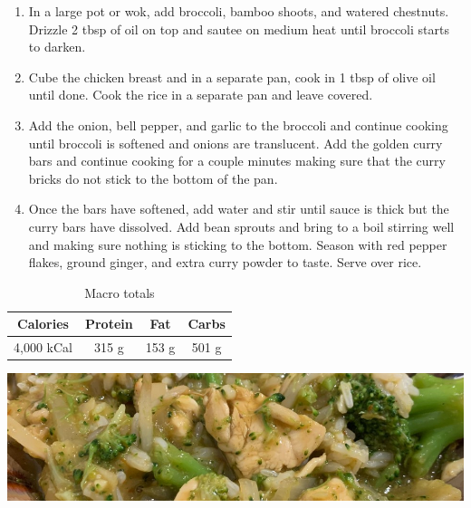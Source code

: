 \begin{multicols}{2}
\begin{enumerate}
\item In a large pot or wok, add broccoli, bamboo shoots, and watered chestnuts. Drizzle 2 tbsp of oil on top and sautee on medium heat until broccoli starts to darken.


\medskip
\item Cube the chicken breast and in a separate pan, cook in 1 tbsp of olive oil until done. Cook the rice in a separate pan and leave covered.
\medskip

\item Add the onion, bell pepper, and garlic to the broccoli and continue cooking until broccoli is softened and onions are translucent. Add the golden curry bars and continue cooking for a couple minutes making sure that the curry bricks do not stick to the bottom of the pan.
\newline 

 \item Once the bars have softened, add water and stir until sauce is thick but the curry bars have dissolved. Add bean sprouts and bring to a boil stirring well and making sure nothing is sticking to the bottom. Season with red pepper flakes, ground ginger, and extra curry powder to taste. Serve over rice.  
\end{enumerate}
\begin{centering}
\begin{table}[H]
  \begin{center}
    \caption{Macro totals}
    \label{tab:table1}
    \begin{tabular}{c|c|c|c} %
      \textbf{Calories} & \textbf{Protein} & \textbf{Fat} & \textbf{Carbs}\\
      \hline
      4,000 kCal & 315 g & 153 g & 501 g\\
    \end{tabular}
  \end{center}
\end{table}
\end{centering}
\end{multicols}



\begin{center}
\includegraphics[scale=0.55]{Chicken Recipes/Curry Stir Fry/Curry Stir Fry.jpg}
\end{center}


